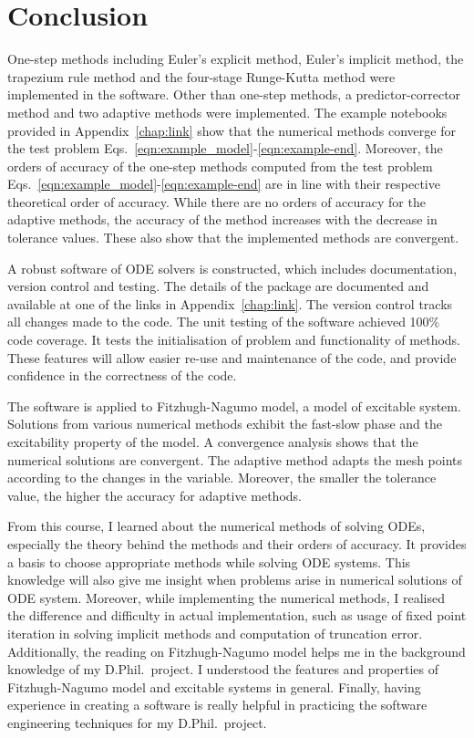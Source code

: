 \chapter{Conclusion}
\label{chap:conclusion}

One-step methods including Euler's explicit method, Euler's implicit method, the trapezium rule method and the four-stage Runge-Kutta method were implemented in the software. Other than one-step methods, a predictor-corrector method and two adaptive methods were implemented. The example notebooks provided in Appendix~\ref{chap:link} show that the numerical methods converge for the test problem Eqs.~\eqref{eqn:example_model}-\eqref{eqn:example-end}. Moreover, the orders of accuracy of the one-step methods computed from the test problem Eqs.~\eqref{eqn:example_model}-\eqref{eqn:example-end} are in line with their respective theoretical order of accuracy. While there are no orders of accuracy for the adaptive methods, the accuracy of the method increases with the decrease in tolerance values. These also show that the implemented methods are convergent.

A robust software of ODE solvers is constructed, which includes documentation, version control and testing. The details of the package are documented and available at one of the links in Appendix~\ref{chap:link}. The version control tracks all changes made to the code. The unit testing of the software achieved 100\% code coverage. It tests the initialisation of problem and functionality of methods. These features will allow easier re-use and maintenance of the code, and provide confidence in the correctness of the code.

The software is applied to Fitzhugh-Nagumo model, a model of excitable system. Solutions from various numerical methods exhibit the fast-slow phase and the excitability property of the model. A convergence analysis shows that the numerical solutions are convergent. The adaptive method adapts the mesh points according to the changes in the variable. Moreover, the smaller the tolerance value, the higher the accuracy for adaptive methods.

From this course, I learned about the numerical methods of solving ODEs, especially the theory behind the methods and their orders of accuracy. It provides a basis to choose appropriate methods while solving ODE systems. This knowledge will also give me insight when problems arise in numerical solutions of ODE system. Moreover, while implementing the numerical methods, I realised the difference and difficulty in actual implementation, such as usage of fixed point iteration in solving implicit methods and computation of truncation error. Additionally, the reading on Fitzhugh-Nagumo model helps me in the background knowledge of my D.Phil.~project. I understood the features and properties of Fitzhugh-Nagumo model and excitable systems in general. Finally, having experience in creating a software is really helpful in practicing the software engineering techniques for my D.Phil.~project.

